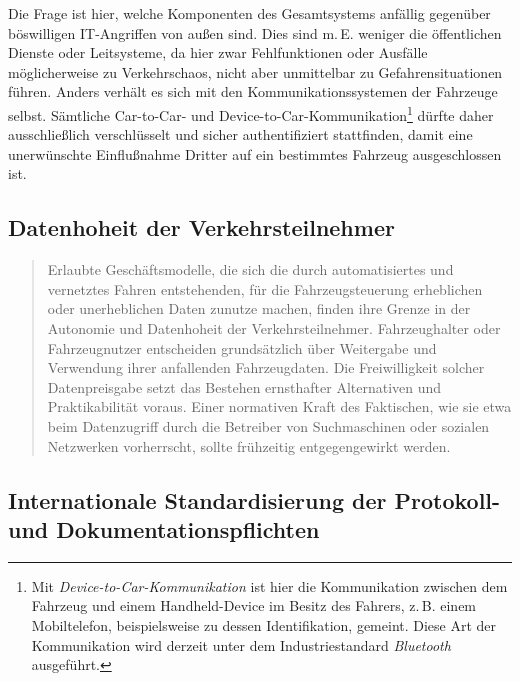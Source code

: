 \documentclass[twoside,a4paper,12pt]{article}
\begin{document}
Die Frage ist hier, welche Komponenten des Gesamtsystems anfällig gegenüber böswilligen IT-Angriffen von außen sind. Dies sind m.\,E. weniger 
die öffentlichen Dienste oder Leitsysteme, da hier zwar Fehlfunktionen oder Ausfälle möglicherweise zu Verkehrschaos, nicht aber unmittelbar zu 
Gefahrensituationen führen. Anders verhält es sich
mit den Kommunikationssystemen der Fahrzeuge selbst. Sämtliche Car-to-Car- und Device-to-Car-Kommunikation\footnote{Mit \textit{Device-to-Car-Kommunikation} 
ist hier die Kommunikation zwischen dem Fahrzeug und einem Handheld-Device im Besitz des Fahrers, z.\,B. einem Mobiltelefon, beispielsweise zu dessen
Identifikation, gemeint. Diese Art der Kommunikation wird derzeit unter dem Industriestandard \textit{Bluetooth}~\cite{bt} ausgeführt.} dürfte daher ausschließlich verschlüsselt 
und sicher authentifiziert stattfinden, damit eine unerwünschte Einflußnahme Dritter auf ein bestimmtes Fahrzeug ausgeschlossen ist.

\subsection{Datenhoheit der Verkehrsteilnehmer} \label{DatenhoheitDerVerkehrsteilnehmer}

\begin{quote}
\glqq
Erlaubte Geschäftsmodelle, die sich die durch automatisiertes und vernetztes Fahren entstehenden, für die Fahrzeugsteuerung 
erheblichen oder unerheblichen Daten zunutze
machen, finden ihre Grenze in der Autonomie und Datenhoheit der Verkehrsteilnehmer.
Fahrzeughalter oder Fahrzeugnutzer entscheiden grundsätzlich über Weitergabe und
Verwendung ihrer anfallenden Fahrzeugdaten. Die Freiwilligkeit solcher Datenpreisgabe
setzt das Bestehen ernsthafter Alternativen und Praktikabilität voraus. Einer normativen
Kraft des Faktischen, wie sie etwa beim Datenzugriff durch die Betreiber von Suchmaschinen oder sozialen Netzwerken vorherrscht, 
sollte frühzeitig entgegengewirkt werden.\grqq\mbox{~\cite[S. 12]{ek}}
\end{quote}

\subsection{Internationale Standardisierung der Protokoll- und Dokumentationspflichten} \label{InternationaleStandardisierungDerProtokollUndDokumentationspflichten}
\end{document}
